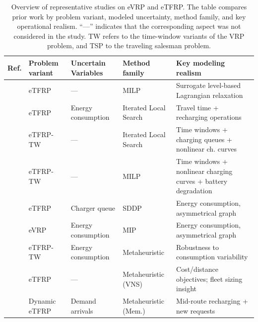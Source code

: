 \documentclass[a4paper,fleqn]{cas-sc}
\begin{document}
\begin{table}
\scriptsize
\centering
\setlength{\tabcolsep}{4pt}
\renewcommand{\arraystretch}{1.15}
\caption{Overview of representative studies on eVRP and eTFRP. The table compares prior work by problem variant, modeled uncertainty, method family, and key operational realism. ``---'' indicates that the corresponding aspect was not considered in the study. TW refers to the time-window variants of the VRP problem, and TSP to the traveling salesman problem.}
\label{tab:taxonomy}
\begin{tabular}{p{0.5cm}p{1.8cm}p{3.0cm}p{2.5cm}p{7cm}}
\toprule
\textbf{Ref.} &
\textbf{Problem variant} &
\textbf{Uncertain Variables} &
\textbf{Method family} &
\textbf{Key modeling realism} \\
\midrule


\cite{BRAGIN2024104494} &
eTFRP &
--- &
MILP &
Surrogate level-based Lagrangian relaxation \\

\cite{SPINELLI2026105480} &
eTFRP &
Energy consumption &
Iterated Local Search &
Travel time + recharging operations \\

\cite{WANG2025104932} &
eTFRP-TW &
--- &
Iterated Local Search &
Time windows + charging queues + nonlinear ch. curves \\

\cite{cataldo_2023} &
eTFRP-TW &
--- &
MILP &
Time windows + nonlinear charging curves + battery degradation \\

\cite{ziyan2025} &
eTFRP &
Charger queue &
SDDP &
Energy consumption, asymmetrical graph \\

\cite{WANG2024123407} &
eVRP &
Energy consumption &
MIP &
Energy consumption, asymmetrical graph \\

\midrule


\cite{AMIRI2023109108} &
eTFRP-TW &
Energy consumption &
Metaheuristic &
Robustness to consumption variability \\

\cite{euchi_hybrid_2023} &
eTFRP &
--- &
Metaheuristic (VNS) &
Cost/distance objectives; fleet sizing insight \\

\cite{dong_dynamic_2023} &
Dynamic eTFRP &
Demand arrivals &
Metaheuristic (Mem.) &
Mid-route recharging + new requests \\


\end{tabular}
\end{table}
\end{document}
